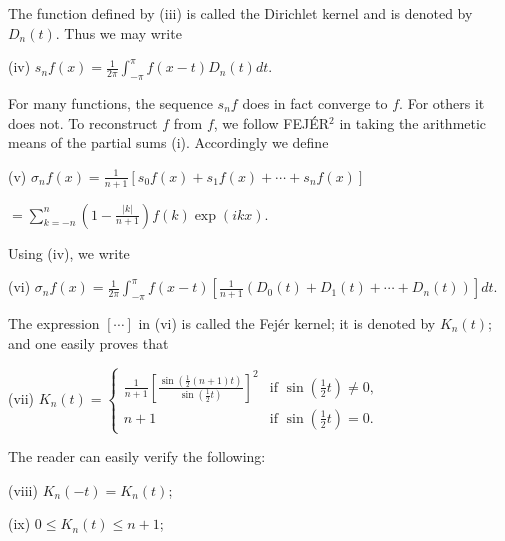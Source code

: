 The function defined by (iii) is called the Dirichlet kernel and is denoted by $D_n(t)$. Thus we may write

(iv) $s_n f(x) = \frac{1}{2\pi} \int_{-\pi}^{\pi} f(x - t) D_n(t) dt$.

For many functions, the sequence $s_n f$ does in fact converge to $f$. For others it does not. To reconstruct $f$ from $f$, we follow FEJÉR$^2$ in taking the arithmetic means of the partial sums (i). Accordingly we define

(v) $\sigma_n f(x) = \frac{1}{n + 1} \left[ s_0 f(x) + s_1 f(x) + \cdots + s_n f(x) \right]$

$= \sum_{k=-n}^{n} \left( 1 - \frac{|k|}{n + 1} \right) f(k) \exp(i k x)$.

Using (iv), we write

(vi) $\sigma_n f(x) = \frac{1}{2\pi} \int_{-\pi}^{\pi} f(x - t) \left[ \frac{1}{n + 1} \left( D_0(t) + D_1(t) + \cdots + D_n(t) \right) \right] dt$.

The expression $[\cdots]$ in (vi) is called the Fejér kernel; it is denoted by $K_n(t)$; and one easily proves that

(vii) $K_n(t) = \begin{cases} \frac{1}{n + 1} \left[ \frac{\sin\left(\frac{1}{2}(n + 1)t\right)}{\sin\left(\frac{1}{2}t\right)} \right]^2 & \text{if } \sin\left(\frac{1}{2}t\right) \neq 0, \\ n + 1 & \text{if } \sin\left(\frac{1}{2}t\right) = 0. \end{cases}$

The reader can easily verify the following:

(viii) $K_n(-t) = K_n(t)$;

(ix) $0 \leq K_n(t) \leq n + 1$;